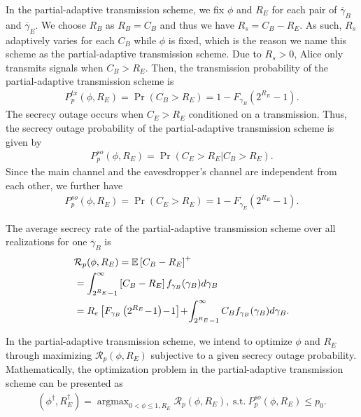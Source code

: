 \documentclass[journal]{IEEEtran}
\DeclareMathOperator*{\argmax}{argmax}
\begin{document}
In the partial-adaptive transmission scheme, we fix $\phi$ and $R_E$ for each pair of $\overline{\gamma}_B$ and $\overline{\gamma}_E$. We choose $R_B$ as $R_B = C_B$ and thus we have $R_s = C_B - R_E$. As such, $R_s$ adaptively varies for each $C_B$ while $\phi$ is fixed, which is the reason we name this scheme as the partial-adaptive transmission scheme.
Due to $R_s > 0$, Alice only transmits signals when $C_B > R_E$. Then, the transmission probability of the partial-adaptive transmission scheme is
\begin{align}
P^{tx}_p(\phi, R_E) = \Pr(C_B > R_E) = 1-F_{\gamma_B}\left(2^{R_E}-1\right).
\end{align}
The secrecy outage occurs when $C_E>R_E$ conditioned on a transmission. Thus, the secrecy outage probability of the partial-adaptive transmission scheme is given by
\begin{align}
P^{so}_p(\phi, R_E) = \Pr(C_E > R_E|C_B > R_E).
\end{align}
Since the main channel and the eavesdropper's channel are independent from each other, we further have
\begin{align}
P^{so}_p(\phi, R_E) = \Pr(C_E > R_E) = 1\!-\!F_{\gamma_E}\left(2^{R_E}\!-\!1\right).
\end{align}


The average secrecy rate of the partial-adaptive transmission scheme over all realizations for one $\overline{\gamma}_B$ is
\begin{align}
&\mathcal{R}_p (\phi, R_E) = \mathbb{E}\left[C_B-R_E\right]^{+} \notag \\
&= \int_{2^{R_E}-1}^{\infty} \left[C_B-R_E\right] f_{\gamma_B}(\gamma_B) d \gamma_B \notag \\
& = R_e \left[F_{\gamma_B}\left(2^{R_E}\!-\!1\right)\!-\!1\right] \!+\! \int_{2^{R_E}-1}^{\infty} C_B f_{\gamma_B}(\gamma_B) d \gamma_B.
\end{align}

In the partial-adaptive transmission scheme, we intend to optimize $\phi$ and $R_E$ through maximizing $\mathcal{R}_p (\phi, R_E)$ subjective to a given secrecy outage probability. Mathematically, the optimization problem in the partial-adaptive transmission scheme can be presented as
\begin{align}\label{opt_partial}
(\phi^{\dag}, R_E^{\dag}) \!=\! \argmax_{0< \phi \leq 1, R_E} \mathcal{R}_p (\phi, R_E), ~\text{s.t.}~ P^{so}_p(\phi, R_E) \leq p_0.
\end{align}
\end{document}
